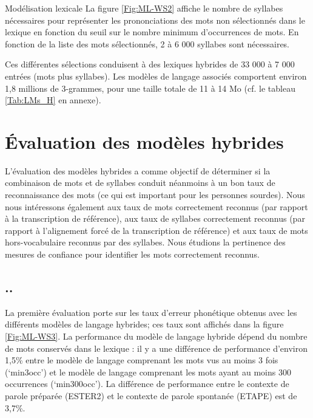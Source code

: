 \documentclass{style/these}
\newcommand{\hiddensubsection}[1]{
    \stepcounter{subsection}
    \subsection*{\arabic{chapter}.\arabic{section}.\arabic{subsection}\hspace{1em}{#1}}
}
\begin{document}
\begin{part}{Modélisation lexicale}
La figure \ref{Fig:ML-WS2} affiche le nombre de syllabes nécessaires pour représenter les prononciations des mots non sélectionnés dans le lexique en fonction du seuil sur le  nombre minimum d'occurrences de mots. En fonction de la liste des mots sélectionnés, 2 à 6 000 syllabes sont nécessaires.  

Ces différentes sélections conduisent à des lexiques hybrides de 33 000 à 7 000 entrées (mots plus syllabes). Les modèles de langage associés comportent environ 1,8 millions de 3-grammes, pour une taille totale de 11 à 14 Mo (cf. le tableau \ref{Tab:LMs_H} en annexe).


\section{Évaluation des modèles hybrides}
\renewcommand{\rightmark}{Évaluation des modèles hybrides}

L'évaluation des modèles hybrides a comme objectif de déterminer si la combinaison de mots et de syllabes conduit néanmoins à un bon taux de reconnaissance des mots (ce qui est important pour les personnes sourdes).
Nous nous intéressons également aux taux de mots correctement reconnus (par rapport à la transcription de référence), aux taux de syllabes correctement reconnus (par rapport à l'alignement forcé de la transcription de référence) et aux taux de mots hors-vocabulaire reconnus par des syllabes. 
Nous étudions la pertinence des mesures de confiance pour identifier les mots correctement reconnus. 

\hiddensubsection{Taux d'erreur phonétique}

La première évaluation porte sur les taux d'erreur phonétique obtenus avec les différents modèles de langage hybrides; ces taux sont affichés dans la figure \ref{Fig:ML-WS3}.
La performance du modèle de langage hybride dépend du nombre de mots conservés dans le lexique : il y a une différence de performance d'environ 1,5\% entre le modèle de langage comprenant les mots vus au moins 3 fois (`min3occ') et le modèle de langage comprenant les mots ayant au moins 300 occurrences (`min300occ').  La différence de performance entre le contexte de parole préparée (ESTER2) et le contexte de parole spontanée (ETAPE) est de 3,7\%.  


\end{part}
\end{document}
